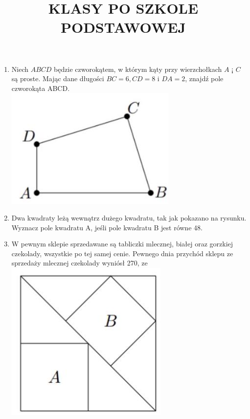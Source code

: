 \documentclass[10pt]{article}
\title{KLASY PO SZKOLE PODSTAWOWEJ }
\author{}
\date{}
\begin{document}
\maketitle
\begin{enumerate}
  \item Niech \(A B C D\) będzie czworokątem, w którym kąty przy wierzchołkach \(A\) ¡ \(C\) są proste. Mając dane długości \(B C=6, C D=8\) i \(D A=2\), znajdź pole czworokąta ABCD.\\
\includegraphics[max width=\textwidth, center]{2024_11_21_64f83780a6f94f658a62g-1(1)}
  \item Dwa kwadraty leżą wewnątrz dużego kwadratu, tak jak pokazano na rysunku. Wyznacz pole kwadratu A, jeśli pole kwadratu B jest równe 48.
  \item W pewnym sklepie sprzedawane są tabliczki mlecznej, białej oraz gorzkiej czekolady, wszystkie po tej samej cenie. Pewnego dnia przychód sklepu ze sprzedaży mlecznej czekolady wyniósł 270, ze\\
\includegraphics[max width=\textwidth, center]{2024_11_21_64f83780a6f94f658a62g-1}\\

\end{enumerate}
\end{document}
